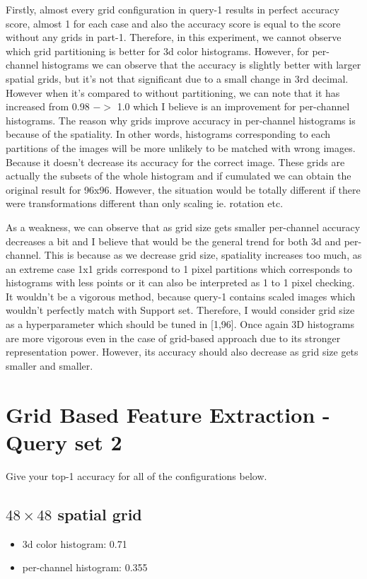 \documentclass[12pt]{article}
\begin{document}
Firstly, almost every grid configuration in query-1 results in perfect accuracy score, almost 1 for each case
and also the accuracy score is equal to the score without any grids in part-1.
Therefore, in this experiment, we cannot observe which grid partitioning is better for 3d color histograms.
However, for per-channel histograms we can observe that the accuracy is slightly better with 
larger spatial grids, but it's not that significant due to a small change in 3rd decimal.
However when it's compared to without partitioning, we can note that it has increased
from 0.98 $->$ 1.0 which I believe is an improvement for per-channel histograms.
The reason why grids improve accuracy in per-channel histograms is because of the spatiality.
In other words, histograms corresponding to each partitions of the images 
will be more unlikely to be matched with wrong images. Because it doesn't decrease its
accuracy for the correct image. These grids are actually the subsets of the whole histogram 
and if cumulated we can obtain the original result for 96x96.
However, the situation would be totally different if there were transformations different than only scaling ie. rotation etc. 


As a weakness, we can observe that as grid size gets smaller per-channel accuracy decreases a bit 
and I believe that would be the general trend for both 3d and per-channel.
This is because as we decrease grid size, spatiality increases too much,
as an extreme case 1x1 grids correspond to 1 pixel partitions which corresponds to
histograms with less points or it can also be interpreted as 1 to 1 pixel checking.
It wouldn't be a vigorous method, because query-1 contains scaled images which wouldn't 
perfectly match with Support set. Therefore, I would consider grid size as a hyperparameter
which should be tuned in [1,96]. Once again 3D histograms are more vigorous even in the case of
grid-based approach due to its stronger representation power. However, its accuracy should also decrease as
grid size gets smaller and smaller.

\section{Grid Based Feature Extraction - Query set 2}
Give your top-1 accuracy for all of the configurations below.

\subsection{$48\times48$ spatial grid}
\begin{itemize}
\item 3d color histogram: 0.71
\item per-channel histogram: 0.355
\end{itemize}
\end{document}
